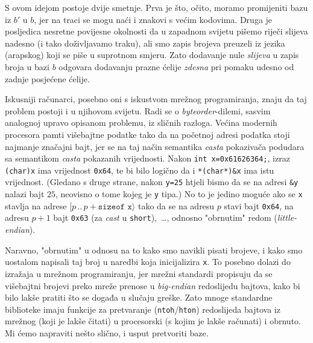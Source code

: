 S ovom idejom postoje dvije smetnje. Prva je što, očito, moramo promijeniti bazu iz $b'$ u $b$, jer na traci se mogu naći i znakovi s većim kodovima. Druga je posljedica nesretne povijesne okolnosti da u zapadnom svijetu pišemo riječi slijeva nadesno (i tako doživljavamo traku), ali smo zapis brojeva preuzeli iz jezika (arapskog) koji se piše u suprotnom smjeru. Zato dodavanje nule \emph{slijeva} u zapis broja u bazi $b$ odgovara dodavanju prazne ćelije \emph{zdesna} pri pomaku udesno od zadnje posjećene ćelije.

Iskusniji računarci, posebno oni s iskustvom mrežnog programiranja, znaju da taj problem postoji i u njihovom svijetu. Radi se o \emph{byteorder}-dilemi, sasvim analognoj upravo opisanom problemu, iz sličnih razloga. Većina modernih procesora pamti višebajtne podatke tako da na početnoj adresi podatka stoji najmanje značajni bajt, jer se na taj način semantika \emph{casta} pokazivača podudara sa semantikom \emph{casta} pokazanih vrijednosti. Nakon \texttt{int x=0x61626364;}, izraz \texttt{(char)x} ima vrijednost \texttt{0x64}, te bi bilo logično da i \texttt{*(char*)\&x} ima istu vrijednost. (Gledano s druge strane, nakon \texttt{y=25} htjeli bismo da se na adresi \texttt{\&y} nalazi bajt $25$, neovisno o tome kojeg je \texttt y tipa.) No to je jedino moguće ako se \texttt x stavlja na adrese $[p\,..\,p+\texttt{sizeof x}\rangle$ tako da se na adresu $p$ stavi bajt \texttt{0x64}, na adresu $p+1$ bajt \texttt{0x63} (za \emph{cast} u \texttt{short}),~\ldots, odnosno "obrnutim" redom (\emph{little-endian}).

Naravno, "obrnutim" u odnosu na to kako smo navikli pisati brojeve, i kako smo uostalom napisali taj broj u naredbi koja inicijalizira \texttt x. To posebno dolazi do izražaja u mrežnom programiranju, jer mrežni standardi propisuju da se višebajtni brojevi preko mreže prenose u \emph{big-endian} redoslijedu bajtova, kako bi bilo lakše pratiti što se događa u slučaju greške. Zato mnoge standardne biblioteke imaju funkcije za pretvaranje (\texttt{ntoh}/\texttt{hton}) redoslijeda bajtova iz mrežnog (koji je lakše čitati) u procesorski (s kojim je lakše računati) i obrnuto. Mi ćemo napraviti nešto slično, i usput pretvoriti baze.

